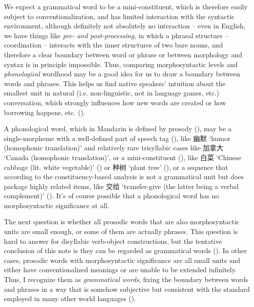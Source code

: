 \documentclass[UTF8, a4paper, oneside, scheme=plain]{ctexrep}
\newcommand*{\term}[1]{\emph{#1}}
\newcommand{\corpus}[1]{\emph{#1}}
\newcommand{\translate}[1]{`#1'}
\begin{document}
We expect a grammatical word to be a mini-constituent, 
which is therefore easily subject to conventionalization, 
and has limited interaction with the syntactic environment,
although definitely not absolutely no interaction -- 
even in English, we have things like \corpus{pre- and post-processing}, 
in which a phrasal structure -- coordination -- interacts 
with the inner structures of two bare nouns, 
and therefore a clear boundary between word or phrase 
or between morphology and syntax is in principle impossible.
Thus, comparing morphosyntactic levels 
and \emph{phonological} wordhood 
may be a good idea for us to draw a boundary 
between words and phrases.
This helps us find native speakers' intuition 
about the smallest unit in natural (i.e. non-linguistic, not in language games, etc.) conversation,
which strongly influences how new words are created 
or how borrowing happens, etc. ().

A phonological word,
which in Mandarin is defined by prosody (),
may be a single-morpheme with a well-defined part of speech tag (),
like 幽默 \translate{humor (homophonic translation)} 
and relatively rare trisyllabic cases 
like 加拿大 \translate{Canada (homophonic translation)},
or a mini-constituent 
(), 
like 白菜 \translate{Chinese cabbage (lit. white vegetable)} 
()
or 种树 \translate{plant tree} (), 
or a sequence that according to 
the constituency-based analysis is not a grammatical unit 
but does package highly related items, 
like 交给 \translate{transfer-give (the latter being a verbal complement)} 
().
It's of course possible that a phonological word 
has no morphosyntactic significance at all.

The next question is 
whether all prosodic words that are also morphosyntactic units 
are small enough, 
or some of them are actually phrases.
This question is hard to answer for 
disyllabic verb-object constructions,
but the tentative conclusion of this note 
is they can be regarded as grammatical words
().
In other cases, prosodic words with morphosyntactic significance
are all small units and either have conventionalized meanings 
or are unable to be extended infinitely.
Thus, I recognize them as \term{grammatical words},
fixing the boundary between words and phrases in a way 
that is somehow subjective but consistent with 
the standard employed in many other world languages
().
\end{document}
